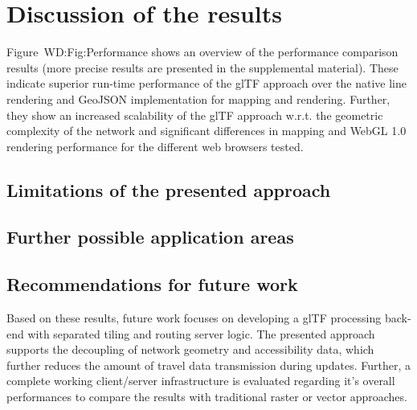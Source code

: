 
\cleardoublepage              %
\chapter{Discussion of the results}
  \label{chap:discu}
  Figure~{WD:Fig:Performance} shows an overview of the performance comparison
  results (more precise results are presented in the supplemental material).
  These indicate superior run-time performance of the glTF approach over
  the native line rendering and GeoJSON implementation for mapping and rendering.
  Further, they show an increased scalability of the glTF approach w.r.t. the
  geometric complexity of the network and significant differences in mapping
  and WebGL 1.0 rendering performance for the different web browsers tested.\par
  \section{Limitations of the presented approach}
    \label{sec:discu:limit}
  \section{Further possible application areas}
    \label{sec:discu:applc}
  \section{Recommendations for future work}
    \label{sec:discu:futur}
    Based on these results, future work focuses on developing a glTF processing
    back-end with separated tiling and routing server logic. The presented approach
    supports the decoupling of network geometry and accessibility data, which further
    reduces the amount of travel data transmission during updates. Further, a complete
    working client/server infrastructure is evaluated regarding it's overall
    performances to compare the results with traditional raster or vector approaches.\par

